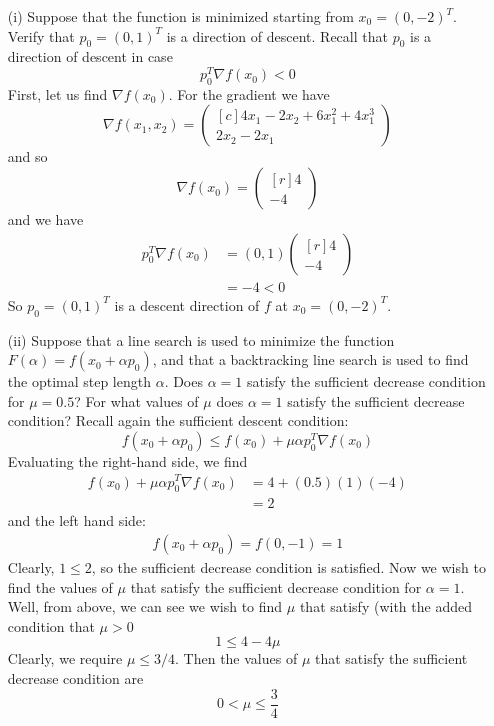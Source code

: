 \documentclass{article}
\begin{document}
\begin{itemize}
    \item[(i)] Suppose that the function is minimized starting from $x_0 = (0,-2)^T$. Verify that $p_0 = (0,1)^T$ is a direction of descent.
    \newline\newline
    Recall that $p_0$ is a direction of descent in case
    \[p_0^T\nabla f(x_0) < 0\]
    First, let us find $\nabla f(x_0)$. For the gradient we have
    \[\nabla f(x_1,x_2) = \begin{pmatrix*}[c]
        4x_1 - 2x_2 + 6x_1^2 + 4x_1^3\\
        2x_2 - 2x_1
    \end{pmatrix*}\]
    and so
    \[\nabla f(x_0) = \begin{pmatrix*}[r]
        4\\
        -4
    \end{pmatrix*}\]
    and we have
    \begin{align*}
        p_0^T\nabla f(x_0) &= (0,1)\begin{pmatrix*}[r]
            4\\
            -4
        \end{pmatrix*}\\
        &= -4 < 0
    \end{align*}
    So $p_0 = (0,1)^T$ is a descent direction of $f$ at $x_0 = (0,-2)^T$.
    
    \item[(ii)] Suppose that a line search is used to minimize the function $F(\alpha) = f(x_0 + \alpha p_0)$, and that a backtracking line search is used to find the optimal step length $\alpha$. Does $\alpha = 1$ satisfy the sufficient decrease condition for $\mu = 0.5$? For what values of $\mu$ does $\alpha = 1$ satisfy the sufficient decrease condition?
    \newline\newline
    Recall again the sufficient descent condition:
    \[f(x_0 + \alpha p_0) \leq f(x_0) + \mu\alpha p_0^T\nabla f(x_0)\]
    Evaluating the right-hand side, we find
    \begin{align*}
        f(x_0) + \mu\alpha p_0^T\nabla f(x_0) &= 4 + (0.5)(1)(-4)\\
        &= 2
    \end{align*}
    and the left hand side:
    \begin{align*}
        f(x_0 + \alpha p_0) = f(0,-1) = 1
    \end{align*}
    Clearly, $1 \leq 2$, so the sufficient decrease condition is satisfied. Now we wish to find the values of $\mu$ that satisfy the sufficient decrease condition for $\alpha = 1$. Well, from above, we can see we wish to find $\mu$ that satisfy (with the added condition that $\mu > 0$
    \[1 \leq 4 - 4\mu\]
    Clearly, we require $\mu \leq 3/4$. Then the values of $\mu$ that satisfy the sufficient decrease condition are
    \[0 < \mu \leq \frac{3}{4}\]
    
    
\end{itemize}
\end{document}

